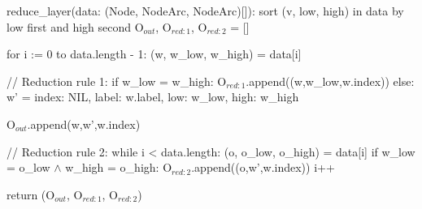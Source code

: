 \begin{blstlisting}
  reduce_layer(data: (Node, NodeArc, NodeArc)[]):
      sort (v, low, high) in data by low first and high second
      O$_{\mathit{out}}$, O$_{\mathit{red:}1}$, O$_{\mathit{red:}2}$ = []

      for i := 0 to data.length - 1:
          (w, w_low, w_high) = data[i]

          // Reduction rule 1:
          if w_low = w_high:
              O$_{\mathit{red:}1}$.append((w,w_low,w.index))
          else:
              w' = {
                index: NIL,
                label: w.label,
                low: w_low,
                high: w_high
              }

              O$_{\mathit{out}}$.append(w,w',w.index)

              // Reduction rule 2:
              while i < data.length:
                  (o, o_low, o_high) = data[i]
                  if w_low = o_low $\land$ w_high = o_high:
                      O$_{\mathit{red:}2}$.append((o,w',w.index))
                      i++

      return (O$_{\mathit{out}}$, O$_{\mathit{red:}1}$, O$_{\mathit{red:}2}$)
\end{blstlisting}
